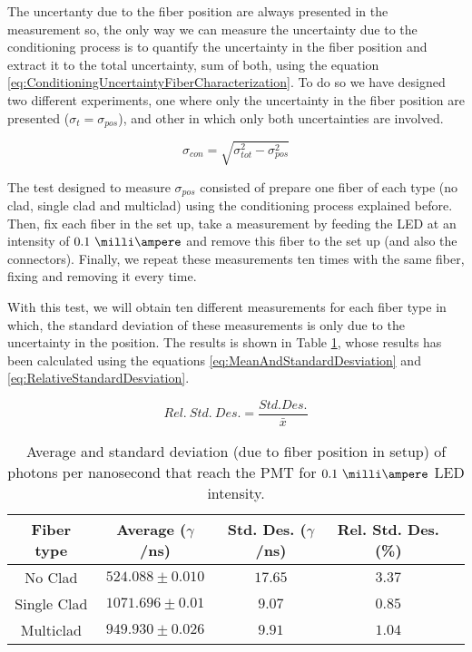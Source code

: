 The uncertanty due to the fiber position are always presented in the measurement so, the only way we can measure the uncertainty due to the conditioning process is to quantify the uncertainty in the fiber position and extract it to the total uncertainty, sum of both, using the equation \ref{eq:ConditioningUncertaintyFiberCharacterization}. To do so we have designed two different experiments, one where only the uncertainty in the fiber position are presented ($\sigma_{t} = \sigma_{pos}$), and other in which only both uncertainties are involved.

\begin{equation}
\sigma_{con} = \sqrt{\sigma^2_{tot} - \sigma^2_{pos} }
\label{eq:ConditioningUncertaintyFiberCharacterization}
\end{equation}

The test designed to measure $\sigma_{pos}$ consisted of prepare one fiber of each type (no clad, single clad and multiclad) using the conditioning process explained before. Then, fix each fiber in the set up, take a measurement by feeding the LED at an intensity of $0.1~\milli\ampere$ and remove this fiber to the set up (and also the connectors). Finally, we repeat these measurements ten times with the same fiber, fixing and removing it every time.

With this test, we will obtain ten different measurements for each fiber type in which, the standard deviation of these measurements is only due to the uncertainty in the position. The results is shown in Table \ref{tab:PositionStandardDeviation}, whose results has been calculated using the equations \ref{eq:MeanAndStandardDesviation} and \ref{eq:RelativeStandardDesviation}.

\begin{equation}
Rel.~Std.~Des. = \frac{Std.Des.}{\bar{x}}
\label{eq:RelativeStandardDesviation}
\end{equation}

\begin{table}[htbp]
\begin{center}
\begin{tabular}{|c|c|c|c|c|}
\hline
Fiber type & Average ($\gamma$/ns) & Std. Des. ($\gamma$/ns) & Rel. Std. Des. (\%)\\
\hline \hline \hline
No Clad & $524.088 \pm 0.010$ & $17.65$ & $3.37$ \\ \hline
Single Clad & $1071.696 \pm 0.01$ & $9.07$ & $0.85$ \\ \hline
Multiclad & $949.930 \pm 0.026$ & $9.91$ & $1.04$ \\ \hline
\end{tabular}
\caption{Average and standard deviation (due to fiber position in setup) of photons per nanosecond that reach the PMT for $0.1~\milli\ampere$ LED intensity.}
\label{tab:PositionStandardDeviation}
\end{center}
\end{table}

